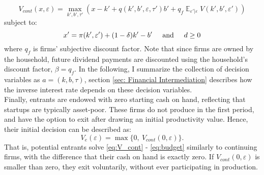 \documentclass[12pt]{article}
\DeclareMathOperator{\E}{\mathbb{E}}
\begin{document}
\begin{equation} \label{eq:V_cont}
    V_{cont}(x,\varepsilon) = \max_{k',b', \tau'} \left(x - k' +  q(k',b',\varepsilon, \tau')b' + q_f \E_{\varepsilon'|\varepsilon} V(k',b', \varepsilon') \right)
\end{equation}
subject to: 
\begin{equation} \label{eq:budget}
x' = \pi(k',\varepsilon')+(1-\delta)k'-b' \hspace{5mm} \text{and} \hspace{5mm} d \geq 0
\end{equation} 
where $q_f$ is firms' subjective discount factor. Note that since firms are owned by the household, future dividend payments are discounted using the household's discount factor, $\beta = q_f$. In the following, I summarize the collection of decision variables as $a = (k, b, \tau) $, section \ref{sec: Financial Intermediation} describes how the inverse interest rate depends on these decision variables.  \vspace{3mm} \\
Finally, entrants are endowed with zero starting cash on hand, reflecting that startups are typically asset-poor. These firms do not produce in the first period, and have the option to exit after drawing an initial productivity value. Hence, their initial decision can be described as: 
\begin{equation} \label{eq:entrant decision}
    V_e(\varepsilon) = \max \{0,  \ V_{cont}(0,\varepsilon) \}.
\end{equation}
That is, potential entrants solve \ref{eq:V_cont} - \ref{eq:budget} similarly to continuing firms, with the difference that their cash on hand is exactly zero. If $V_{cont}(0,\varepsilon)$ is smaller than zero, they exit voluntarily, without ever participating in production.
\end{document}
